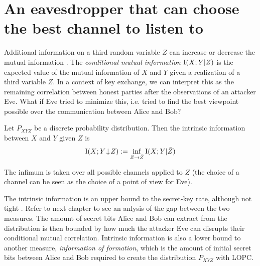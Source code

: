 \section{An eavesdropper that can choose the best channel to listen to}
Additional information on a third random variable $Z$ can increase or decrease the mutual information \cite{CT12}.
    The \emph{conditional mutual information} $\operatorname{I}(X;Y|Z)$ is the expected value of the mutual information of $X$ and $Y$ given a realization of a third variable $Z$.
    In a context of key exchange, we can interpret this as the remaining correlation between honest parties after the observations of an attacker Eve.
    What if Eve tried to minimize this, i.e. tried to find the best viewpoint possible over the communication between Alice and Bob?
    \begin{definition}\cite{MW99, RW03}
    	Let $P_{XYZ}$ be a discrete probability distribution. Then the intrinsic information between $X$ and $Y$ given $Z$ is
    \begin{equation} \label{intrininfo}
    	\operatorname{I}(X;Y\!\downarrow\!Z):= \inf_{Z\rightarrow \bar{Z}} \operatorname{I}(X;Y | \bar{Z})
    \end{equation}
    \end{definition}
    The infimum is taken over all possible channels applied to $Z$ (the choice of a channel can be seen as the choice of a point of view for Eve).
    
    The intrinsic information is an upper bound to the secret-key rate, although not tight \cite{RW03}. 
    Refer to next chapter to see an anlysis of the gap between the two measures.
    The amount of secret bits Alice and Bob can extract from the distribution is then bounded by how much the attacker Eve can disrupts their conditional mutual correlation.
    Intrinsic information is also a lower bound to another measure, \emph{information of formation}, which is the amount of initial secret bits between Alice and Bob required to create the distribution $P_{XYZ}$ with LOPC.
    
   
